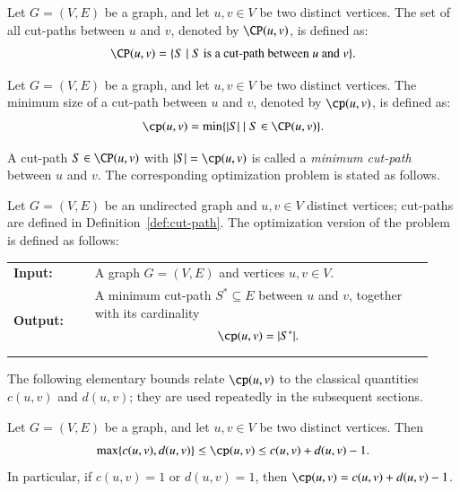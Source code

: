 \begin{definition}
\label{def:cut-paths}
Let $G = (V, E)$ be a graph, and let $u, v \in V$ be two distinct vertices.
The set of all cut-paths between $u$ and $v$, denoted by $\CP(u, v)$, is defined as:
\[
\CP(u, v) = \{ S \mid S \text{ is a cut-path between } u \text{ and } v \}.
\]
\end{definition}

\begin{definition}
\label{def:cp-value}
Let $G = (V, E)$ be a graph, and let $u, v \in V$ be two distinct vertices.
The minimum size of a cut-path between $u$ and $v$, denoted by $\cp(u, v)$, is defined as:
\[
\cp(u, v) = \min\{ |S| \mid S \in \CP(u, v) \}.
\]
\end{definition}

A cut-path $S \in \CP(u, v)$ with $|S| = \cp(u, v)$ is called a \emph{minimum cut-path} between $u$ and $v$.
The corresponding optimization problem is stated as follows.

\begin{problem}
Let $G=(V,E)$ be an undirected graph and $u,v \in V$ distinct vertices; cut-paths are defined in Definition~\ref{def:cut-path}.
The optimization version of the \MinCutPath{} problem is defined as follows:

\begin{center}
\begin{tabular}{p{0.18\linewidth}p{0.75\linewidth}}
\textbf{Input:} & A graph $G=(V,E)$ and vertices $u,v \in V$. \\
\textbf{Output:} & A minimum cut-path $S^* \subseteq E$ between $u$ and $v$, together with its cardinality
\[
\cp(u,v) = |S^*|.
\]
\end{tabular}
\end{center}
\end{problem}

The following elementary bounds relate $\cp(u, v)$ to the classical quantities $c(u, v)$ and $d(u, v)$; they are used repeatedly in the subsequent sections.

\begin{lemma}
\label{lem:basic-bounds}
Let $G = (V, E)$ be a graph, and let $u, v \in V$ be two distinct vertices. Then
\[
\max\{c(u, v), d(u, v)\} \leq \cp(u, v) \leq c(u, v) + d(u, v) - 1.
\]
In particular, if $c(u, v) = 1$ or $d(u, v) = 1$, then $\cp(u, v) = c(u, v) + d(u, v) - 1$.
\end{lemma}

